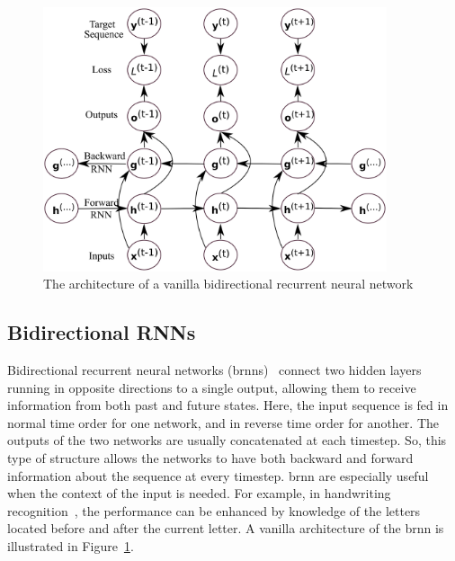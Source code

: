 \begin{figure}[t]
	\centering
	\includegraphics[width=0.9\textwidth]{figures/brnn.eps}
	\caption{The architecture of a vanilla bidirectional recurrent neural network \label{fig:bidirectional_rnn}}
\end{figure}



\subsection{Bidirectional RNNs}
Bidirectional recurrent neural networks (\gls{brnn}s)~\cite{Schuster_97} connect two hidden layers running in opposite directions to a single output, allowing them to receive information from both past and future states. Here, the input sequence is fed in normal time order for one network, and in reverse time order for another. The outputs of the two networks are usually concatenated at each timestep. So, this type of structure allows the networks to have both backward and forward information about the sequence at every timestep. \gls{brnn} are especially useful when the context of the input is needed. For example, in handwriting recognition~\cite{Graves_08}, the performance can be enhanced by knowledge of the letters located before and after the current letter.  A vanilla architecture of the \gls{brnn} is illustrated in Figure~\ref{fig:bidirectional_rnn}. 


